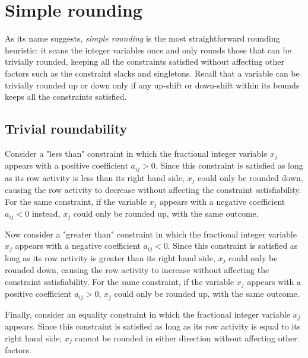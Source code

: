 \documentclass[a4paper,12pt,twoside]{scrbook}
\begin{document}
\section{Simple rounding} \label{sec:simplerounding}
As its name suggests, \textit{simple rounding} is the most straightforward rounding heuristic: it scans the integer variables once and only rounds those that can be trivially rounded, keeping all the constraints satisfied without affecting other factors such as the constraint slacks and singletons.
Recall that a variable can be trivially rounded up or down only if any up-shift or down-shift within its bounds keeps all the constraints satisfied. \par

\subsection{Trivial roundability} \label{sec:trivialround}
Consider a "less than" constraint in which the fractional integer variable $x_j$ appears with a positive coefficient $a_{ij} > 0$. Since this constraint is satisfied as long as its row activity is less than its right hand side, $x_j$ could only be rounded down, causing the row activity to decrease without affecting the constraint satisfiability. For the same constraint, if the variable $x_j$ appears with a negative coefficient $a_{ij} < 0$ instead, $x_j$ could only be rounded up, with the same outcome. \par 
Now consider a "greater than" constraint in which the fractional integer variable $x_j$ appears with a negative coefficient $a_{ij} < 0$. Since this constraint is satisfied as long as its row activity is greater than its right hand side, $x_j$ could only be rounded down, causing the row activity to increase without affecting the constraint satisfiability. For the same constraint, if the variable $x_j$ appears with a positive coefficient $a_{ij} > 0$, $x_j$ could only be rounded up, with the same outcome. \par 
Finally, consider an equality constraint in which the fractional integer variable $x_j$ appears. Since this constraint is satisfied as long as its row activity is equal to its right hand side, $x_j$ cannot be rounded in either direction without affecting other factors. \par
\end{document}
